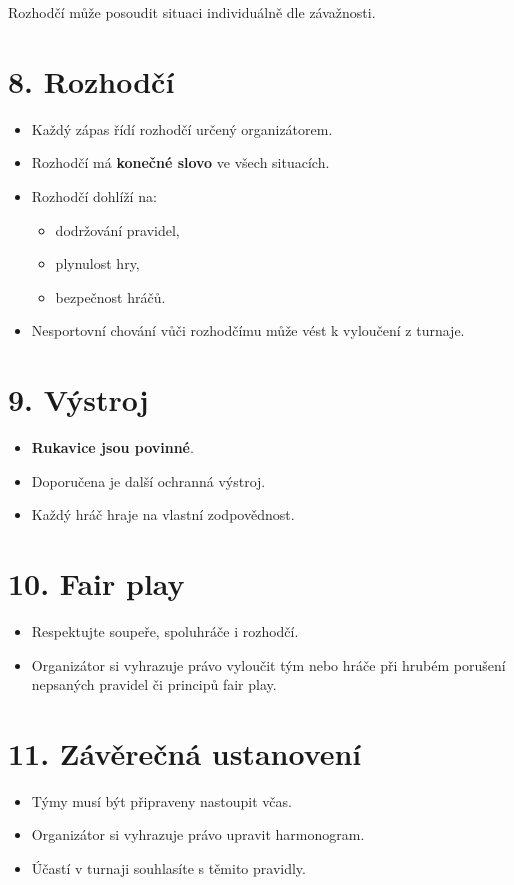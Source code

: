 \documentclass[a4paper,12pt]{article}
\begin{document}
Rozhodčí může posoudit situaci individuálně dle závažnosti.

\section*{8. Rozhodčí}
\begin{itemize}
    \item Každý zápas řídí rozhodčí určený organizátorem.
    \item Rozhodčí má \textbf{konečné slovo} ve všech situacích.
    \item Rozhodčí dohlíží na:
    \begin{itemize}
        \item dodržování pravidel,
        \item plynulost hry,
        \item bezpečnost hráčů.
    \end{itemize}
    \item Nesportovní chování vůči rozhodčímu může vést k vyloučení z turnaje.
\end{itemize}

\section*{9. Výstroj}
\begin{itemize}
    \item \textbf{Rukavice jsou povinné}.
    \item Doporučena je další ochranná výstroj.
    \item Každý hráč hraje na vlastní zodpovědnost.
\end{itemize}

\section*{10. Fair play}
\begin{itemize}
    \item Respektujte soupeře, spoluhráče i rozhodčí.
    \item Organizátor si vyhrazuje právo vyloučit tým nebo hráče při hrubém porušení nepsaných pravidel či principů fair play.
\end{itemize}

\section*{11. Závěrečná ustanovení}
\begin{itemize}
    \item Týmy musí být připraveny nastoupit včas.
    \item Organizátor si vyhrazuje právo upravit harmonogram.
    \item Účastí v turnaji souhlasíte s těmito pravidly.
\end{itemize}
\end{document}
